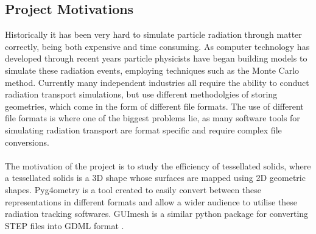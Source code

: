 \documentclass[12pt,a4paper]{article}
\begin{document}
\subsection{Project Motivations}
\label{motiv}
\noindent Historically it has been very hard to simulate particle radiation through matter correctly, being both expensive and time consuming. As computer technology has developed through recent years particle physicists have began building models to simulate these radiation events, employing techniques such as the Monte Carlo method. Currently many independent industries all require the ability to conduct radiation transport simulations, but use different methodolgies of storing geometries, which come in the form of different file formats. The use of different file formats is where one of the biggest problems lie, as many software tools for simulating radiation transport are format specific and require complex file conversions. 
\\\\
The motivation of the project is to study the efficiency of tessellated solids, where a tessellated solids is a 3D shape whose surfaces are mapped using 2D geometric shapes. Pyg4ometry is a tool created to easily convert between these representations in different formats and allow a wider audience to utilise these radiation tracking softwares. GUImesh is a similar python package for converting STEP files into GDML format \cite{meh}.
\end{document}
